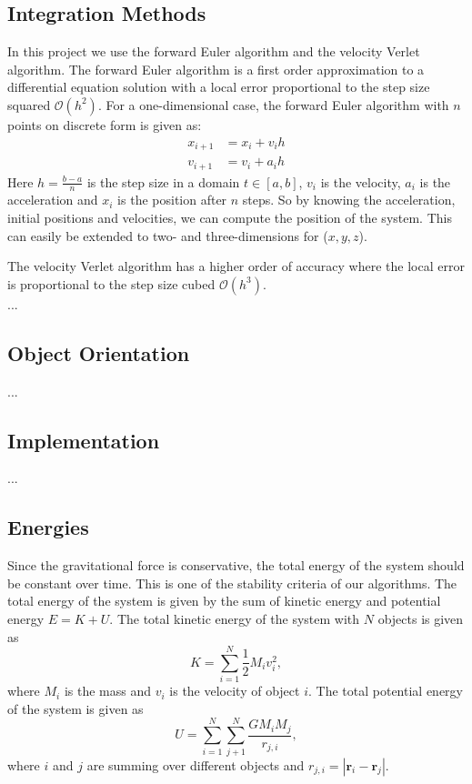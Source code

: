 \documentclass[12pt,a4paper,english]{article}
\begin{document}
\subsection{Integration Methods}
\label{subsect:Integration}
In this project we use the forward Euler algorithm and the velocity Verlet algorithm. The forward Euler algorithm is a first order approximation to a differential equation solution with a local error proportional to the step size squared $\mathcal{O}(h^2)$. For a one-dimensional case, the forward Euler algorithm with $n$ points on discrete form is given as:
\begin{align}
\label{eq:1D_Euler}
x_{i+1}&=x_i+v_ih\\
v_{i+1}&=v_i+a_ih
\end{align}
Here $h=\frac{b-a}{n}$ is the step size in a domain $t\in[a,b]$, $v_i$ is the velocity, $a_i$ is the acceleration and $x_i$ is the position after $n$ steps. So by knowing the acceleration, initial positions and velocities, we can compute the position of the system. This can easily be extended to two- and three-dimensions for ($x,y,z$).

The velocity Verlet algorithm has a higher order of accuracy where the local error is proportional to the step size cubed $\mathcal{O}(h^3)$.\\
...
\subsection{Object Orientation}
...
\subsection{Implementation}
...
\subsection{Energies}
\label{eq:Energies}
Since the gravitational force is conservative, the total energy of the system should be constant over time. This is one of the stability criteria of our algorithms. The total energy of the system is given by the sum of kinetic energy and potential energy $E=K+U$. The total kinetic energy of the system with $N$ objects is given as
\begin{equation}
\label{eq:K}
K=\sum_{i=1}^{N}\frac{1}{2}M_iv_i^2,
\end{equation}
where $M_i$ is the mass and $v_i$ is the velocity of object $i$. The total potential energy of the system is given as 
\begin{equation}
\label{eq:U}
U=\sum_{i=1}^{N}\sum_{j+1}^{N}\frac{GM_iM_j}{r_{j,i}},
\end{equation}
where $i$ and $j$ are summing over different objects and $r_{j,i}=|\textbf{r}_i-\textbf{r}_j|$.
\end{document}
